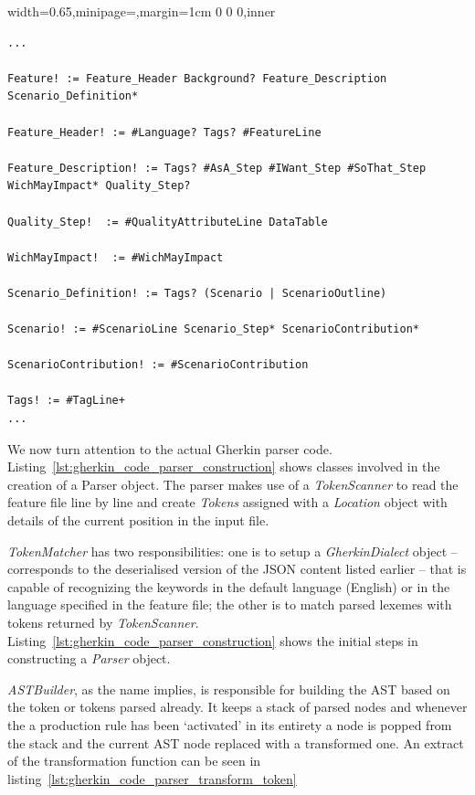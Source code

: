 \documentclass[dissertation,final]{softeng}
\newenvironment{featurecode}[1]
{ \lrbox\featurebox \begin{adjustbox}{width=#1\textwidth,minipage=\textwidth,margin=1cm 0 0 0,inner} }
{ \end{adjustbox}\endlrbox}
\newenvironment{featurelist}[2]
{
\newcommand{\setcaption}{\caption{#1}}
\newcommand{\setlabel}{\label{#2}}
}
{\begin{listing}[h!]\centering\usebox\featurebox\setcaption\setlabel\end{listing}}
\begin{document}
\begin{featurelist}{Changes to gherkin grammar}{lst:changes_to_gherkin_grammar}
\begin{featurecode}{0.65}
\begin{verbatim}
...

Feature! := Feature_Header Background? Feature_Description Scenario_Definition*

Feature_Header! := #Language? Tags? #FeatureLine

Feature_Description! := Tags? #AsA_Step #IWant_Step #SoThat_Step WichMayImpact* Quality_Step?

Quality_Step!  := #QualityAttributeLine DataTable

WichMayImpact!  := #WichMayImpact

Scenario_Definition! := Tags? (Scenario | ScenarioOutline)

Scenario! := #ScenarioLine Scenario_Step* ScenarioContribution*

ScenarioContribution! := #ScenarioContribution

Tags! := #TagLine+
...

\end{verbatim}
\end{featurecode}
\end{featurelist}

We now turn attention to the actual Gherkin parser code. Listing~\ref{lst:gherkin_code_parser_construction} shows classes involved in the creation of a Parser object. The parser makes use of a \emph{TokenScanner} to read the feature file line by line and create \emph{Tokens} assigned with a \emph{Location} object with details of the current position in the input file.

\emph{TokenMatcher} has two responsibilities: one is to setup a \emph{GherkinDialect} object -- corresponds to the deserialised version of the JSON content listed earlier -- that is capable of recognizing the keywords in the default language (English) or in the language specified in the feature file; the other is to match parsed lexemes with tokens returned by \emph{TokenScanner}. Listing~\ref{lst:gherkin_code_parser_construction} shows the initial steps in constructing a \emph{Parser} object.

\emph{ASTBuilder}, as the name implies, is responsible for building the AST based on the token or tokens parsed already. It keeps a stack of parsed nodes and whenever the a production rule has been `activated' in its entirety a node is popped from the stack and the current AST node replaced with a transformed one. An extract of the transformation function can be seen in listing~\ref{lst:gherkin_code_parser_transform_token} 
\end{document}
